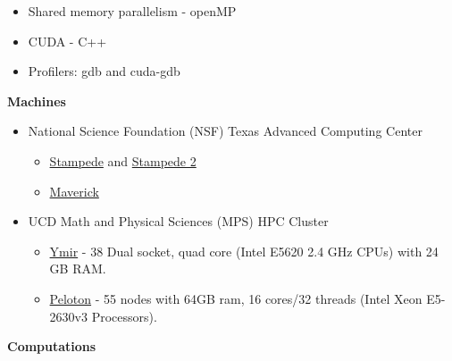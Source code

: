 \documentclass[11pt]{ltxdoc}
\begin{document}
\begin{description}
\begin{description}
\begin{itemize}
          \item Shared memory parallelism - openMP
      
          \item CUDA - C++
      
          \item Profilers: gdb and cuda-gdb
      
      \end{itemize}
      
    \item[] \textbf{Machines}
    
      \vskip 06pt 
      
      \begin{itemize}
        
        \item National Science Foundation (NSF) Texas Advanced Computing Center
      
      \begin{itemize}
      	
        \item \href{https://portal.xsede.org/tacc-stampede}{Stampede} and \href{https://portal.xsede.org/tacc-stampede2}{Stampede 2}
        
        \item \href{https://portal.xsede.org/tacc-maverick}{Maverick} 
        
      \end{itemize}
  
      \item UCD Math and Physical Sciences (MPS) HPC Cluster
      
        \begin{itemize}
      	
          \item \href{https://wiki.cse.ucdavis.edu/support/systems/ymir}{Ymir} - 38 Dual socket, quad core (Intel E5620 2.4 GHz CPUs) with 24 GB RAM.
        
          \item \href{https://wiki.cse.ucdavis.edu/support/systems/peloton}{Peloton} - 55 nodes with 64GB ram, 16 cores/32 threads (Intel Xeon E5-2630v3 Processors).
        
        \end{itemize}
  
      \end{itemize}  

    \item[] \textbf{Computations}
    

\end{description}
\end{description}
\end{document}

